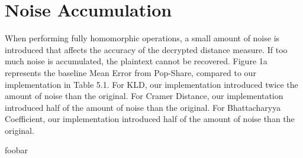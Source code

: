 \section{Noise Accumulation}

When performing fully homomorphic operations, a small amount of noise is introduced that affects the accuracy of the decrypted distance measure. If too much noise is accumulated, the plaintext cannot be recovered. Figure 1a represents the baseline Mean Error from Pop-Share, compared to our implementation in Table 5.1. For KLD, our implementation introduced twice the amount of noise than the original. For Cramer Distance, our implementation introduced half of the amount of noise than the original. For Bhattacharyya Coefficient, our implementation introduced half of the amount of noise than the original.



foobar
